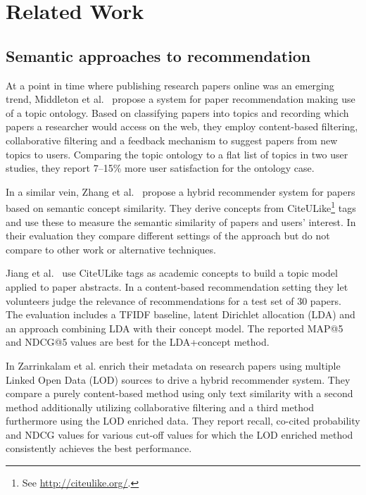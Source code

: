 \chapter{Related Work}\label{chap:relatedwork}

\section{Semantic approaches to recommendation}

At a point in time where publishing research papers online was an emerging trend, Middleton et al.~\cite{Middleton2001} propose a system for paper recommendation making use of a topic ontology. Based on classifying papers into topics and recording which papers a researcher would access on the web, they employ content-based filtering, collaborative filtering and a feedback mechanism to suggest papers from new topics to users. Comparing the topic ontology to a flat list of topics in two user studies, they report 7--15\% more user satisfaction for the ontology case.

In a similar vein, Zhang et al.~\cite{Zhang2008} propose a hybrid recommender system for papers based on semantic concept similarity. They derive concepts from CiteULike\footnote{See \url{http://citeulike.org/}.} tags and use these to measure the semantic similarity of papers and users' interest. In their evaluation they compare different settings of the approach but do not compare to other work or alternative techniques.

Jiang et al.~\cite{Jiang2012} use CiteULike tags as academic concepts to build a topic model applied to paper abstracts. In a content-based recommendation setting they let volunteers judge the relevance of recommendations for a test set of 30 papers. The evaluation includes a TFIDF baseline, latent Dirichlet allocation (LDA) and an approach combining LDA with their concept model. The reported MAP@5 and NDCG@5 values are best for the LDA+concept method.

In \cite{Zarrinkalam2012} Zarrinkalam et al. enrich their metadata on research papers using multiple Linked Open Data (LOD) sources to drive a hybrid recommender system. They compare a purely content-based method using only text similarity with a second method additionally utilizing collaborative filtering and a third method furthermore using the LOD enriched data. They report recall, co-cited probability and NDCG values for various cut-off values for which the LOD enriched method consistently achieves the best performance.


